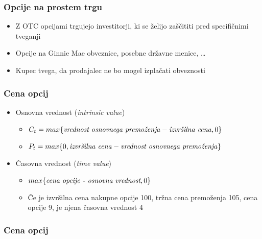 \documentclass[14pt]{beamer}
\begin{document}
\begin{frame}    
    \frametitle{Opcije na prostem trgu}
    \begin{itemize}
        \item Z OTC opcijami trgujejo investitorji, ki se želijo zaščititi pred specifičnimi tveganji
        \item Opcije na Ginnie Mae obveznice, posebne državne menice, \ldots
        \item Kupec tvega, da prodajalec ne bo mogel izplačati obveznosti
    \end{itemize}
\end{frame}

\begin{frame}
    \frametitle{Cena opcij}
    \begin{itemize}
        \item Osnovna vrednost (\textit{intrinsic value})
        \begin{itemize}
            \item $C_{t} = max\{\text{\textit{vrednost osnovnega premoženja}} - \text{\textit{izvršilna cena}}, 0\}$
            \item $P_{t} = max\{0, \text{\textit{izvršilna cena}} - \text{\textit{vrednost osnovnega premoženja}}\}$
        \end{itemize}
        \pause
            \item Časovna vrednost (\textit{time value})
            \begin{itemize}
                \item $max\{\textit{\text{cena opcije} - \text{osnovna vrednost}},0 \}$
                \item Če je izvršilna cena nakupne opcije 100\textdollar, tržna cena premoženja 105\textdollar, cena opcije 9\textdollar, je njena časovna vrednost 4\textdollar
            \end{itemize}
    \end{itemize}
\end{frame}

\begin{frame}
    \frametitle{Cena opcij}
       
\end{frame}
\end{document}

